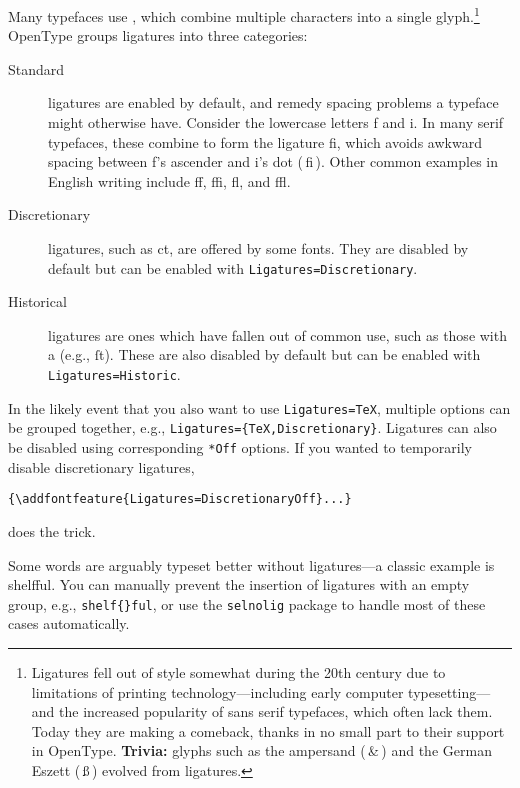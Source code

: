 Many typefaces use , which combine multiple characters
into a single glyph.\punckern\footnote{Ligatures fell out
of style somewhat during the 20{th}
century due to limitations of printing technology---including early
computer typesetting---and the increased popularity of sans serif typefaces,
which often lack them.
Today they are making a comeback,
thanks in no small part to their support in OpenType.
\textbf{Trivia:} glyphs such as the ampersand
(\,\&\,) and the German Eszett (\,ß\,) evolved
from ligatures.}
OpenType groups ligatures into three categories:
\begin{description}
\item[Standard] ligatures are enabled by default, and remedy spacing problems
    a typeface might otherwise have. Consider the lowercase letters f
    and i.
    In many serif typefaces, these combine
    to form the ligature fi, which avoids awkward spacing between f's ascender
    and i's dot
    { (\,fi\,)}.
    Other common examples in English writing include ff,
    ffi, fl, and ffl.
\item[Discretionary] ligatures, such as
    {ct},
    are offered by some fonts.
    They are disabled by default
    but can be enabled with
    \verb|Ligatures=Discretionary|.
\item[Historical] ligatures are ones which have fallen out of common use,
    such as those with a  (e.g., ſt).
    These are also disabled by default
    but can be enabled with \verb|Ligatures=Historic|.
\end{description}
In the likely event that you also want to use \verb|Ligatures=TeX|,
multiple options can be grouped together, e.g.,
\verb|Ligatures={TeX,Discretionary}|.
Ligatures can also be disabled using corresponding \verb|*Off|
options. If you wanted to temporarily disable discretionary ligatures,
\begin{leftfigure}
\begin{lstlisting}
{\addfontfeature{Ligatures=DiscretionaryOff}...}
\end{lstlisting}
\end{leftfigure}
does the trick.

Some words are arguably typeset better without ligatures---a classic example
is shelfful.\punckern{}
You can manually prevent the insertion of ligatures with an empty group,
e.g., \verb|shelf{}ful|,
or use the \texttt{selnolig} package to handle most of these cases automatically.

